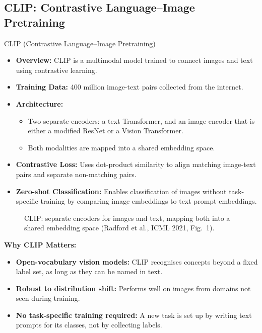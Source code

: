 \subsection{CLIP: Contrastive Language–Image Pretraining}
\begin{frame}[allowframebreaks]{CLIP (Contrastive Language–Image Pretraining)}
    \begin{itemize}
        \item \textbf{Overview:} CLIP is a multimodal model trained to connect images and text using contrastive learning.
        \item \textbf{Training Data:} 400 million image-text pairs collected from the internet.
        \item \textbf{Architecture:}
        \begin{itemize}
            \item Two separate encoders: a text Transformer, and an image encoder that is either a modified ResNet or a Vision Transformer.
            \item Both modalities are mapped into a shared embedding space.
        \end{itemize}
        \item \textbf{Contrastive Loss:} Uses dot-product similarity to align matching image-text pairs and separate non-matching pairs.
        \item \textbf{Zero-shot Classification:} Enables classification of images without task-specific training by comparing image embeddings to text prompt embeddings.
    \end{itemize}
\framebreak
    \begin{figure}
        \centering
        \caption*{CLIP: separate encoders for images and text, mapping both into a shared embedding space (Radford et al., ICML 2021, Fig.~1).}
    \end{figure}
\framebreak
    \textbf{Why CLIP Matters:}
        \begin{itemize}
            \item \textbf{Open-vocabulary vision models:} CLIP recognises concepts beyond a fixed label set, as long as they can be named in text.
            \item \textbf{Robust to distribution shift:} Performs well on images from domains not seen during training.
            \item \textbf{No task-specific training required:} A new task is set up by writing text prompts for its classes, not by collecting labels.

\end{itemize}
\end{frame}
